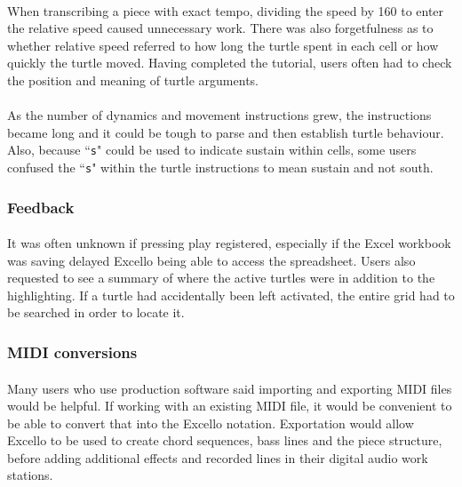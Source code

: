 \paragraph{} When transcribing a piece with exact tempo, dividing the speed by 160 to enter the relative speed caused unnecessary work. There was also forgetfulness as to whether relative speed referred to how long the turtle spent in each cell or how quickly the turtle moved. Having completed the tutorial, users often had to check the position and meaning of turtle arguments.

\paragraph{} As the number of dynamics and movement instructions grew, the instructions became long and it could be tough to parse and then establish turtle behaviour. Also, because ``\texttt{s}" could be used to indicate sustain within cells, some users confused the ``\texttt{s}" within the turtle instructions to mean sustain and not south.

\subsubsection{Feedback}

\paragraph{} It was often unknown if pressing play registered, especially if the Excel workbook was saving delayed Excello being able to access the spreadsheet. Users also requested to see a summary of where the active turtles were in addition to the highlighting. If a turtle had accidentally been left activated, the entire grid had to be searched in order to locate it.

\subsubsection{MIDI conversions}

\paragraph{} Many users who use production software said importing and exporting MIDI files would be helpful. If working with an existing MIDI file, it would be convenient to be able to convert that into the Excello notation. Exportation would allow Excello to be used to create chord sequences, bass lines and the piece structure, before adding additional effects and recorded lines in their digital audio work stations.

